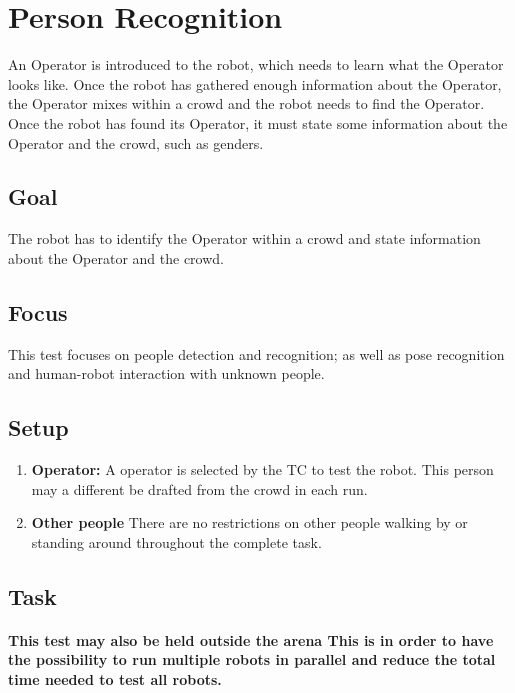 \section{Person Recognition}

An Operator is introduced to the robot, which needs to learn what the Operator looks like. Once the robot has gathered enough information about the Operator, the Operator mixes within a crowd and the robot needs to find the Operator. Once the robot has found its Operator, it must state some information about the Operator and the crowd, such as genders.

\subsection{Goal}
The robot has to identify the Operator within a crowd and state information about the Operator and the crowd.

\subsection{Focus}

This test focuses on people detection and recognition; as well as pose recognition and human-robot interaction with unknown people.

\subsection{Setup}

\begin{enumerate}
\item \textbf{Operator:} A  operator is selected by the TC to test the robot. 
  This person may a different be drafted from the crowd in each run.
\item \textbf{Other people} There are no restrictions on other people walking by or standing around throughout the complete task.
\end{enumerate}

\subsection{Task}
\paragraph{This test may also be held outside the arena
  This is in order to have the possibility to run multiple robots in parallel and reduce the total time needed to test all robots.}

